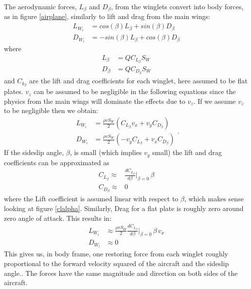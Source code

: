 The aerodynamic forces, $L_\beta$ and $D_\beta$, from the winglets convert into body forces, as in figure \ref{airplane}, similarly to lift and drag from the main wings:
\begin{equation}\begin{split}
L_{W_i} &= cos(\beta) L_\beta +  sin(\beta)D_\beta \\
D_{W_i} & = -sin(\beta) L_\beta + cos(\beta) D_\beta
\end{split}\end{equation}
where
\begin{equation}\begin{split}
L_\beta &= Q C_{L_\beta} S_W \\
D_\beta & = Q C_{D_\beta} S_W
\end{split}\end{equation}
and $C_{k_\beta}$ are the lift and drag coefficients for each winglet, here assumed to be flat plates.
$v_z$ can be assumed to be negligible in the following equations since the physics from the main wings will dominate the effects due to $v_z$.
If we assume $v_z$ to be negligible then we obtain:
\begin{equation}\begin{split}
L_{W_i} &= 
    \frac{\rho v S_W}{2}  \left( C_{L_\beta} v_x + v_y C_{D_\beta} \right) \\
%
D_{W_i} &= 
    \frac{\rho v S_W}{2 }  \left(-v_y C_{L_\beta} + v_x C_{D_\beta} \right)
\end{split} .
\end{equation}
If the sideslip angle, $\beta$, is small (which implies $v_y$ small) the lift and drag coefficients can be approximated as 
\begin{equation}\begin{split}
    C_{L_\beta} \approx& \frac{d C_{L_\beta}}{d \beta} \big\vert_{\beta=0} \, \beta \\
    C_{D_\beta} \approx& 0
\end{split}\end{equation}
where the Lift coefficient is assumed linear with respect to $\beta$, which makes sense looking at figure \ref{clalpha}.
Similarly, Drag for a flat plate is roughly zero around zero angle of attack.
This results in:
\begin{equation}\begin{split}
L_{W_i} &\approx 
    \frac{\rho v S_W}{2} \frac{d C_{L_\beta}}{d \beta} \big\vert_{\beta=0} \, \beta \, v_x  \\
%
D_{W_i} &\approx 0
\end{split}\end{equation}
This gives us, in body frame, one restoring force from each winglet roughly proportional to the forward velocity squared of the aircraft and the sideslip angle..
The forces have the same magnitude and direction on both sides of the aircraft.




